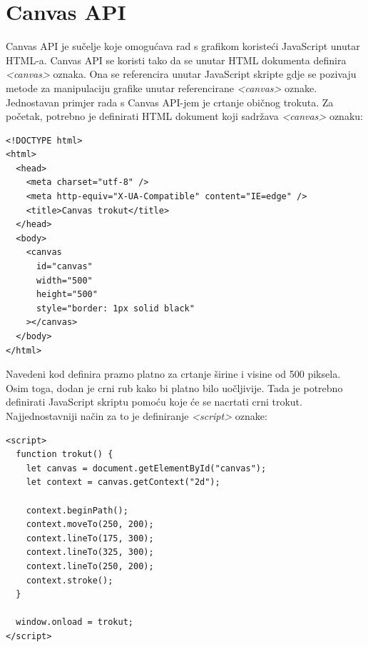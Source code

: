 \documentclass{foi}
\begin{document}
\section{Canvas API}
Canvas API je sučelje koje omogućava rad s grafikom koristeći JavaScript unutar HTML-a. Canvas API se koristi tako da se unutar HTML dokumenta definira \textit{<canvas>} oznaka. Ona se referencira unutar JavaScript skripte gdje se pozivaju metode za manipulaciju grafike unutar referencirane \textit{<canvas>} oznake. Jednostavan primjer rada s Canvas API-jem je crtanje običnog trokuta. Za početak, potrebno je definirati HTML dokument koji sadržava \textit{<canvas>} oznaku:

\begin{verbatim}
<!DOCTYPE html>
<html>
  <head>
    <meta charset="utf-8" />
    <meta http-equiv="X-UA-Compatible" content="IE=edge" />
    <title>Canvas trokut</title>
  </head>
  <body>
    <canvas
      id="canvas"
      width="500"
      height="500"
      style="border: 1px solid black"
    ></canvas>
  </body>
</html>

\end{verbatim}
Navedeni kod definira prazno platno za crtanje širine i visine od 500 piksela. Osim toga, dodan je crni rub kako bi platno bilo uočljivije. Tada je potrebno definirati JavaScript skriptu pomoću koje će se nacrtati crni trokut. Najjednostavniji način za to je definiranje \textit{<script>} oznake:

\begin{verbatim}
<script>
  function trokut() {
    let canvas = document.getElementById("canvas");
    let context = canvas.getContext("2d");

    context.beginPath();
    context.moveTo(250, 200);
    context.lineTo(175, 300);
    context.lineTo(325, 300);
    context.lineTo(250, 200);
    context.stroke();
  }

  window.onload = trokut;
</script>

\end{verbatim}
\end{document}
